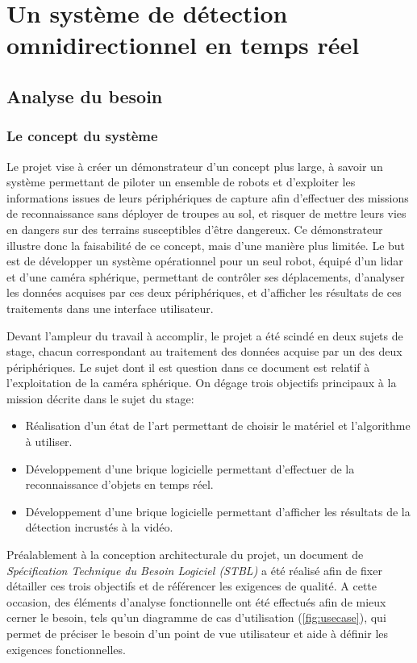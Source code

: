 \chapter{Un système de détection omnidirectionnel en temps réel}

	\section{Analyse du besoin}

		\subsection{Le concept du système}
			
			Le projet vise à créer un démonstrateur d'un concept plus large, à savoir un système permettant de piloter un ensemble de robots et d'exploiter les informations issues de leurs périphériques de capture afin d'effectuer des missions de reconnaissance sans déployer de troupes au sol, et risquer de mettre leurs vies en dangers sur des terrains susceptibles d'être dangereux. Ce démonstrateur illustre donc la faisabilité de ce concept, mais d'une manière plus limitée. Le but est de développer un système opérationnel pour un seul robot, équipé d'un \gls{lidar} et d'une caméra sphérique, permettant de contrôler ses déplacements, d'analyser les données acquises par ces deux périphériques, et d'afficher les résultats de ces traitements dans une interface utilisateur.
			\par
			Devant l'ampleur du travail à accomplir, le projet a été scindé en deux sujets de stage, chacun correspondant au traitement des données acquise par un des deux périphériques. Le sujet dont il est question dans ce document est relatif à l'exploitation de la caméra sphérique. On dégage trois objectifs principaux à la mission décrite dans le sujet du stage:
			\begin{itemize}[noitemsep]
				\item Réalisation d'un état de l'art permettant de choisir le matériel et l'algorithme à utiliser.
				\item Développement d'une brique logicielle permettant d'effectuer de la reconnaissance d'objets en temps réel.
				\item Développement d'une brique logicielle permettant d'afficher les résultats de la détection incrustés à la vidéo.
			\end{itemize}
			\par
			Préalablement à la conception architecturale du projet, un document de \emph{Spécification Technique du Besoin Logiciel (STBL)} a été réalisé afin de fixer détailler ces trois objectifs et de référencer les exigences de qualité. A cette occasion, des éléments d'analyse fonctionnelle ont été effectués afin de mieux cerner le besoin, tels qu'un diagramme de cas d'utilisation (\autoref{fig:usecase}), qui permet de préciser le besoin d'un point de vue utilisateur et aide à définir les exigences fonctionnelles.
			
